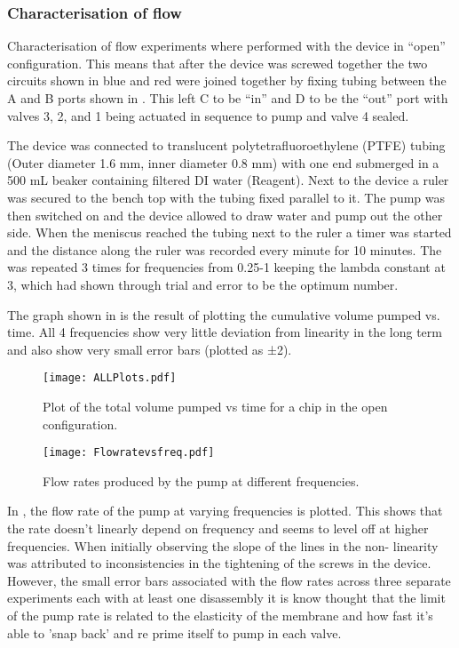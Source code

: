 \subsubsection{Characterisation of flow}

Characterisation of flow experiments where performed with the device in “open”
configuration. This means that after the device was screwed together the two circuits shown
in blue and red were joined together by fixing tubing between the A and B ports shown in
. This left C to be “in” and D to be the “out” port with valves 3, 2, and 1
being actuated in sequence to pump and valve 4 sealed.

The device was connected to translucent polytetrafluoroethylene (PTFE) tubing (Outer
diameter 1.6 mm, inner diameter 0.8 mm) with one end submerged in a 500 mL beaker
containing filtered DI water (Reagent). Next to the device a ruler was secured to the bench
top with the tubing fixed parallel to it. The pump was then switched on and the device
allowed to draw water and pump out the other side. When the meniscus reached the tubing
next to the ruler a timer was started and the distance along the ruler was recorded every
minute for 10 minutes. The was repeated 3 times for frequencies from 0.25-1 keeping the
lambda constant at 3, which had shown through trial and error to be the optimum number.

The graph shown in  is the result of plotting the cumulative volume pumped
vs. time. All 4 frequencies show very little deviation from linearity in the
long term and also show very small error bars (plotted as ±2\sigma).

\begin{figure}
  \begin{center}
  \texttt{[image: ALLPlots.pdf]}
  \caption{Plot of the total volume pumped vs time for a chip in the open
  configuration.}
  \label{fig:Graph}
  \end{center}
\end{figure}

\begin{figure}
  \begin{center}
  \texttt{[image: Flowratevsfreq.pdf]}
  \caption{Flow rates produced by the pump at different frequencies.}
  \label{fig:FRvFGraph}
  \end{center}
\end{figure}

In , the flow rate of the pump at varying frequencies is plotted. This
shows that the rate doesn't linearly depend on frequency and seems to level off at higher
frequencies. When initially observing the slope of the lines in  the non-
linearity was attributed to inconsistencies in the tightening of the screws in the device.
However, the small error bars associated with the flow rates across three separate
experiments each with at least one disassembly it is know thought that the limit of the
pump rate is related to the elasticity of the membrane and how fast it's able to 'snap
back' and re prime itself to pump in each valve.

